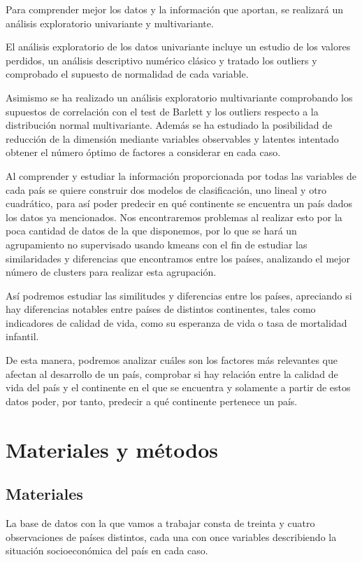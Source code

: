 \documentclass[twoside,openright,titlepage,numbers=noenddot,openany,headinclude,footinclude=true,
cleardoublepage=empty,abstractoff,BCOR=5mm,paper=a4,fontsize=12pt,main=spanish]{scrreprt}
\begin{document}
Para comprender mejor los datos y la información que aportan, se realizará un análisis exploratorio univariante y multivariante.

El análisis exploratorio de los datos univariante incluye un estudio de los valores perdidos, un análisis descriptivo numérico clásico y tratado los outliers y comprobado el supuesto de normalidad de cada variable.

Asimismo se ha realizado un análisis exploratorio multivariante comprobando los supuestos de correlación con el test de Barlett y los outliers respecto a la distribución normal multivariante. Además se ha estudiado la posibilidad de reducción de la dimensión mediante variables observables y latentes intentado obtener el número óptimo de factores a considerar en cada caso.

Al comprender y estudiar la información proporcionada por todas las variables de cada país se quiere construir dos modelos de clasificación, uno lineal y otro cuadrático, para así poder predecir en qué continente se encuentra un país dados los datos ya mencionados. Nos encontraremos problemas al realizar esto por la poca cantidad de datos de la que disponemos, por lo que se hará un agrupamiento no supervisado usando kmeans con el fin de estudiar las similaridades y diferencias que encontramos entre los países, analizando el mejor número de clusters para realizar esta agrupación.

Así podremos estudiar las similitudes y diferencias entre los países, apreciando si hay diferencias notables entre países de distintos continentes, tales como indicadores de calidad de vida, como su esperanza de vida o tasa de mortalidad infantil.

De esta manera, podremos analizar cuáles son los factores más relevantes que afectan al desarrollo de un país, comprobar si hay relación entre la calidad de vida del país y el continente en el que se encuentra y solamente a partir de estos datos poder, por tanto, predecir a qué continente pertenece un país.

\section{Materiales y métodos}

\subsection{Materiales}

La base de datos con la que vamos a trabajar consta de treinta y cuatro observaciones de países distintos, cada una con once variables describiendo la situación socioeconómica del país en cada caso.
\end{document}
